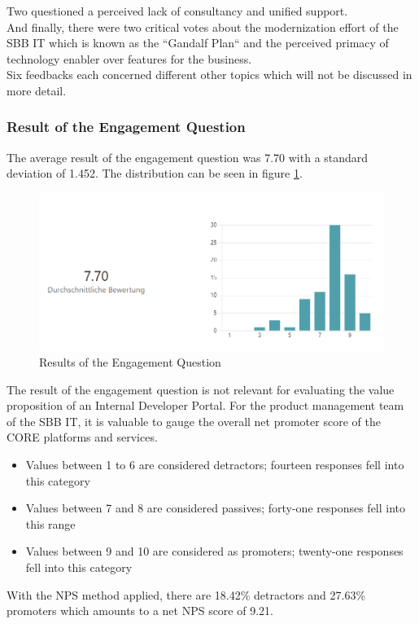 \documentclass[a4paper,10pt]{article}
\begin{document}
    Two questioned a perceived lack of consultancy and unified support.\\
    And finally, there were two critical votes about the modernization effort of the SBB IT which is known as the
    ``Gandalf Plan`` and the perceived primacy of technology enabler over features for the business.\\
    Six feedbacks each concerned different other topics which will not be discussed in more detail.

    \subsubsection{Result of the Engagement Question}
    \label{sssec:rengque}
    The average result of the engagement question was 7.70 with a standard deviation of 1.452.
    The distribution can be seen in figure \ref{fig:engque}.
    \begin{figure}
        \includegraphics[width=\linewidth]{engagement.PNG}
        \caption{Results of the Engagement Question}
        \label{fig:engque}
    \end{figure}
    The result of the engagement question is not relevant for evaluating the value proposition of an Internal Developer Portal.
    For the product management team of the SBB IT, it is valuable to gauge the overall net promoter score\parencite{nps}
    of the CORE platforms and services.
    \begin{itemize}
        \item Values between 1 to 6 are considered detractors; fourteen responses fell into this category
        \item Values between 7 and 8 are considered passives; forty-one responses fell into this range
        \item Values between 9 and 10 are considered as promoters; twenty-one responses fell into this category
    \end{itemize}
    With the NPS method applied, there are 18.42\% detractors and 27.63\% promoters which amounts to a net NPS score of
    9.21.
\end{document}
